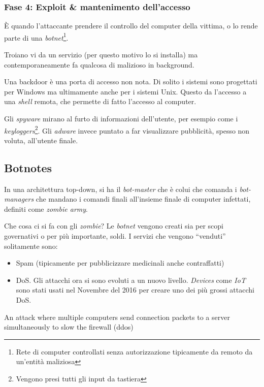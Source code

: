 \subsubsection{Fase 4: Exploit \& mantenimento dell'accesso}

È quando l'attaccante prendere il controllo del computer della vittima, o lo 
rende parte di una \textit{botnet}\footnote{Rete di computer controllati senza 
autorizzazione tipicamente da remoto da un'entità maliziosa}.

Troiano vi da un servizio (per questo motivo lo si installa) ma 
contemporaneamente fa qualcosa di malizioso in background.


Una backdoor è una porta di accesso non nota. Di solito i sistemi sono 
progettati per Windows ma ultimamente anche per i sistemi Unix. Questo da 
l'accesso a una \textit{shell} remota, che permette di fatto l'accesso al 
computer.


Gli \textit{spyware} mirano al furto di informazioni dell'utente, per esempio 
come i \textit{keyloggers}\footnote{Vengono presi tutti gli input da tastiera}. 
Gli \textit{adware} invece puntato a far visualizzare pubblicità, spesso non 
voluta, all'utente finale.

\subsection{Botnotes}

In una architettura top-down, si ha il \textit{bot-master} che è colui che 
comanda i \textit{bot-managers} che mandano i comandi finali all'insieme finale 
di computer infettati, definiti come \textit{zombie army}.

Che cosa ci si fa con gli \textit{zombie}? Le \textit{botnet} vengono creati sia 
per scopi governativi o per più importante, soldi. I servizi che vengono 
``venduti'' solitamente sono:
\begin{itemize}
\item Spam (tipicamente per pubblicizzare medicinali anche contraffatti) 
\item DoS. Gli attacchi ora si sono evoluti a un nuovo livello. \textit{Devices} 
come \textit{IoT} sono stati usati nel Novembre del 2016 per creare uno dei più 
grossi attacchi DoS.
\end{itemize}



An attack where multiple computers send connection packets to a server 
simultaneously to slow the firewall (ddos) 


